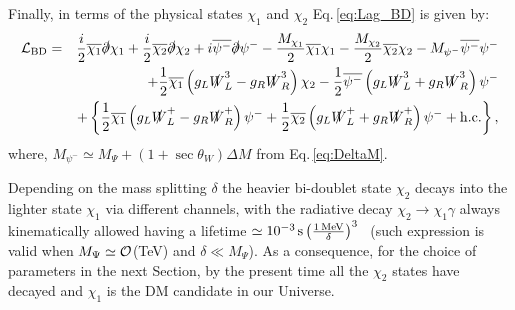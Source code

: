 \documentclass[11pt]{article}
\begin{document}
Finally, in terms of the physical states $\chi_1$ and $\chi_2$
Eq.\,\eqref{eq:Lag_BD} is given by:
\begin{eqnarray}
\mathcal{L}_{\rm BD} &=& 
\dfrac{i}{2}\overline{\chi_1} \slashed{\partial} \chi_1 +
\dfrac{i}{2}\overline{\chi_2} \slashed{\partial} \chi_2 +
i\overline{\psi^{-}} \slashed{\partial} \psi^{-}
-\dfrac{M_{\chi_1}}{2} \overline{\chi_1}\chi_1
-\dfrac{M_{\chi_2}}{2} \overline{\chi_2}\chi_2
-M_{\psi^{-}} \overline{\psi^{-}}\psi^{-} \nonumber \\
&& +\dfrac{1}{2}\overline{\chi_1}
\left(g_{L} \slashed{W}^3_L - g_{R} \slashed{W}^3_R \right)\chi_{2}
- \dfrac{1}{2}\overline{\psi^{-}}
\left(g_{L} \slashed{W}^3_L + g_{R} \slashed{W}^3_R \right)\psi^{-}\nonumber\\
&& + \left\{\dfrac{1}{2} \overline{\chi_1}
\left(g_L\slashed{W}^{+}_{L} - g_R\slashed{W}^{+}_{R}\right)\psi^{-}
+ \dfrac{1}{2} \overline{\chi_2}
\left(g_L\slashed{W}^{+}_{L} + g_R\slashed{W}^{+}_{R}\right)\psi^{-}
+{\rm h.c.} \right\},
\label{eq:Lag_chi12}
\end{eqnarray}
where, $M_{\psi^{-}} \simeq M_{\Psi} + (1+\sec\theta_W)\Delta{M}$
from Eq.\,\eqref{eq:DeltaM}.

Depending on the mass splitting $\delta$ the heavier bi-doublet state $\chi_2$ decays into the lighter state $\chi_1$ via different channels, with the radiative decay $\chi_2 \rightarrow \chi_1 \gamma$ always kinematically allowed having a lifetime $\simeq 10^{-3} \hspace{0.5mm} {\rm s} 
\left( \frac{1 \hspace{0.5mm} {\rm MeV}}{\delta} \right)^3$~\cite{Garcia-Cely_LR_pheno} (such expression is valid when 
$M_\Psi \simeq  {\cal O}$(TeV) and $\delta\ll M_\Psi$).
As a consequence, for the choice of parameters in the next Section, by the present time all the $\chi_2$ states 
have decayed and $\chi_1$ is the DM candidate in our Universe.
\end{document}
